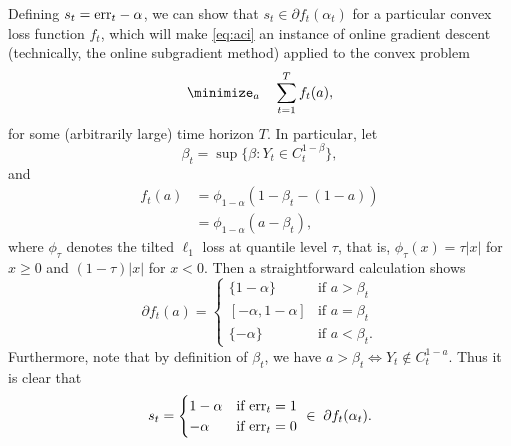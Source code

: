 \documentclass{article}
\begin{document}
Defining $s_t = \text{err}_t - \alpha$, we can show that $s_t \in \partial
f_t(\alpha_t)$ for a particular convex loss function $f_t$, which will make 
\eqref{eq:aci} an instance of online gradient descent (technically, the online
subgradient method) applied to the convex problem
\[
\minimize_a \quad \sum_{t=1}^T f_t(a),
\]
for some (arbitrarily large) time horizon $T$. In particular, let
\[
\beta_t = \sup \{ \beta : Y_t \in C_t^{1-\beta} \}, 
\]
and 
\begin{align*}
\nonumber
f_t(a) &= \phi_{1-\alpha}(1-\beta_t - (1-a)) \\
&= \phi_{1-\alpha}(a - \beta_t),
\end{align*}
where $\phi_\tau$ denotes the tilted $\ell_1$ loss at quantile level $\tau$,
that is, $\phi_\tau(x) = \tau |x|$ for $x \geq 0$ and $(1-\tau) |x|$ for $x <
0$. Then a straightforward calculation shows
\[
\partial f_t(a) = 
\begin{cases}
\{1-\alpha\} & \text{if $a > \beta_t$} \\
[-\alpha, 1-\alpha] & \text{if $a = \beta_t$} \\
\{-\alpha\} & \text{if $a < \beta_t$}.
\end{cases}
\]
Furthermore, note that by definition of $\beta_t$, we have $a > \beta_t \iff Y_t
\notin C_t^{1-a}$. Thus it is clear that
\[
s_t = 
\begin{cases}
1-\alpha & \text{if $\text{err}_t = 1$} \\
-\alpha & \text{if $\text{err}_t = 0$}
\end{cases}
\; \in \; \partial f_t(\alpha_t).
\]




\end{document}
